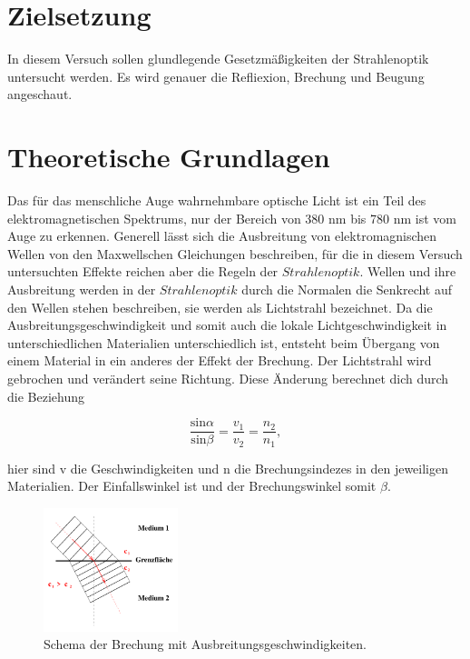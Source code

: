 \section{Zielsetzung}

    \noindent In diesem Versuch sollen glundlegende Gesetzmäßigkeiten der Strahlenoptik untersucht werden.
    Es wird genauer die Refliexion, Brechung und Beugung angeschaut.

\section{Theoretische Grundlagen}

    Das für das menschliche Auge wahrnehmbare optische Licht ist ein Teil des elektromagnetischen Spektrums, nur der Bereich von 380 nm bis 780 
    nm ist vom Auge zu erkennen. Generell lässt sich die Ausbreitung von elektromagnischen Wellen von den Maxwellschen Gleichungen beschreiben, 
    für die in diesem Versuch untersuchten Effekte reichen aber die Regeln der $Strahlenoptik$. Wellen und ihre Ausbreitung werden in der 
    $Strahlenoptik$ durch die Normalen die Senkrecht auf den Wellen stehen beschreiben, sie werden als Lichtstrahl bezeichnet. Da die 
    Ausbreitungsgeschwindigkeit und somit auch die lokale Lichtgeschwindigkeit in unterschiedlichen Materialien unterschiedlich ist, entsteht beim 
    Übergang von einem Material in ein anderes der Effekt der Brechung. Der Lichtstrahl wird gebrochen und verändert seine Richtung. 
    Diese Änderung berechnet dich durch die Beziehung

    \begin{equation}
        \frac{\text{sin}\alpha}{\text{sin} \beta} = \frac{v_1}{v_2} = \frac{n_2}{n_1},
    \end{equation}

    \noindent   hier sind v die Geschwindigkeiten und n die Brechungsindezes in den jeweiligen Materialien. Der Einfallswinkel ist \alpha und der 
    Brechungswinkel somit $\beta$.

    \begin{figure}[H]
        \centering
        \includegraphics[width=0.35\textwidth]{latex/images/T1.PNG}
        \caption{Schema der Brechung mit Ausbreitungsgeschwindigkeiten\protect \cite{V400}.}
    \end{figure}

